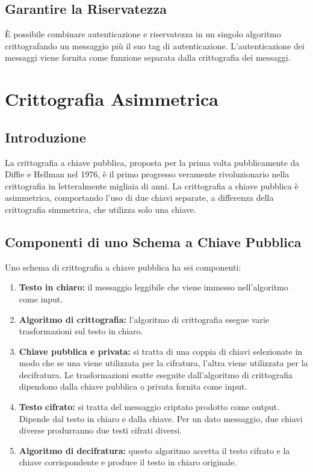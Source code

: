 \subsection{Garantire la Riservatezza}

È possibile combinare autenticazione e riservatezza in un singolo algoritmo crittografando un messaggio più il suo tag di autenticazione. L'autenticazione dei messaggi viene fornita come funzione separata dalla crittografia dei messaggi.

\section{Crittografia Asimmetrica}

\subsection{Introduzione}

La crittografia a chiave pubblica, proposta per la prima volta pubblicamente da Diffie e Hellman nel 1976, è il primo progresso veramente rivoluzionario nella crittografia in letteralmente migliaia di anni. La crittografia a chiave pubblica è asimmetrica, comportando l'uso di due chiavi separate, a differenza della crittografia simmetrica, che utilizza solo una chiave.

\subsection{Componenti di uno Schema a Chiave Pubblica}

Uno schema di crittografia a chiave pubblica ha sei componenti:

\begin{enumerate}
    \item \textbf{Testo in chiaro:} il messaggio leggibile che viene immesso nell'algoritmo come input.
    \item \textbf{Algoritmo di crittografia:} l'algoritmo di crittografia esegue varie trasformazioni sul testo in chiaro.
    \item \textbf{Chiave pubblica e privata:} si tratta di una coppia di chiavi selezionate in modo che se una viene utilizzata per la cifratura, l'altra viene utilizzata per la decifratura. Le trasformazioni esatte eseguite dall'algoritmo di crittografia dipendono dalla chiave pubblica o privata fornita come input.
    \item \textbf{Testo cifrato:} si tratta del messaggio criptato prodotto come output. Dipende dal testo in chiaro e dalla chiave. Per un dato messaggio, due chiavi diverse produrranno due testi cifrati diversi.
    \item \textbf{Algoritmo di decifratura:} questo algoritmo accetta il testo cifrato e la chiave corrispondente e produce il testo in chiaro originale.
\end{enumerate}

